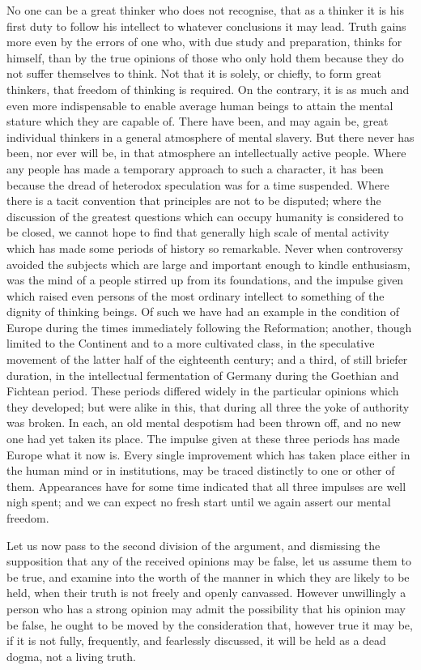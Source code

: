 \documentclass[11pt,openany]{book}
\begin{document}
No one can be a great thinker who does not recognise, that as a thinker it is his first duty to follow his intellect to whatever conclusions it may lead. Truth gains more even by the errors of one who, with due study and preparation, thinks for himself, than by the true opinions of those who only hold them because they do not suffer themselves to think. Not that it is solely, or chiefly, to form great thinkers, that freedom of thinking is required. On the contrary, it is as much and even more indispensable to enable average human beings to attain the mental stature which they are capable of. There have been, and may again be, great individual thinkers in a general atmosphere of mental slavery. But there never has been, nor ever will be, in that atmosphere an intellectually active people. Where any people has made a temporary approach to such a character, it has been because the dread of heterodox speculation was for a time suspended. Where there is a tacit convention that principles are not to be disputed; where the discussion of the greatest questions which can occupy humanity is considered to be closed, we cannot hope to find that generally high scale of mental activity which has made some periods of history so remarkable. Never when controversy avoided the subjects which are large and important enough to kindle enthusiasm, was the mind of a people stirred up from its foundations, and the impulse given which raised even persons of the most ordinary intellect to something of the dignity of thinking beings. Of such we have had an example in the condition of Europe during the times immediately following the Reformation; another, though limited to the Continent and to a more cultivated class, in the speculative movement of the latter half of the eighteenth century; and a third, of still briefer duration, in the intellectual fermentation of Germany during the Goethian and Fichtean period. These periods differed widely in the particular opinions which they developed; but were alike in this, that during all three the yoke of authority was broken. In each, an old mental despotism had been thrown off, and no new one had yet taken its place. The impulse given at these three periods has made Europe what it now is. Every single improvement which has taken place either in the human mind or in institutions, may be traced distinctly to one or other of them. Appearances have for some time indicated that all three impulses are well nigh spent; and we can expect no fresh start until we again assert our mental freedom.

Let us now pass to the second division of the argument, and dismissing the supposition that any of the received opinions may be false, let us assume them to be true, and examine into the worth of the manner in which they are likely to be held, when their truth is not freely and openly canvassed. However unwillingly a person who has a strong opinion may admit the possibility that his opinion may be false, he ought to be moved by the consideration that, however true it may be, if it is not fully, frequently, and fearlessly discussed, it will be held as a dead dogma, not a living truth.
\end{document}
